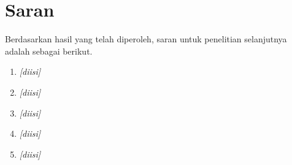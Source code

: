     \section{Saran}\label{sec:suggestion}

        Berdasarkan hasil yang telah diperoleh, saran untuk penelitian selanjutnya adalah sebagai berikut.
        \begin{enumerate}
            \item %
                  \textit{[diisi]}
            \item %
                  \textit{[diisi]}
            \item %
                  \textit{[diisi]}
            \item %
                  \textit{[diisi]}
            \item %
                  \textit{[diisi]}
        \end{enumerate}
